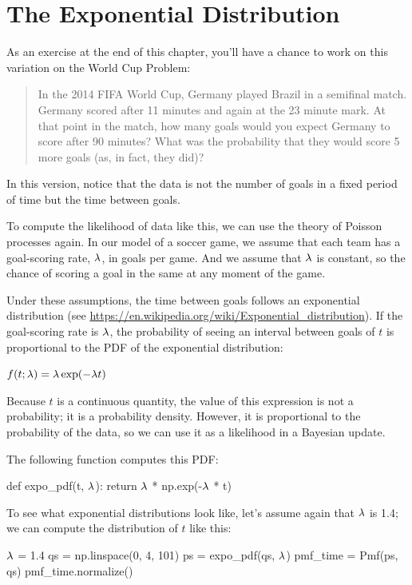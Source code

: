 \documentclass[12pt]{book}
\theoremstyle{exercise}
\begin{document}
\section{The Exponential Distribution}
\label{exponential}

As an exercise at the end of this chapter, you'll have a chance to work on  this variation on the World Cup Problem:

\begin{quote}
In the 2014 FIFA World Cup, Germany played Brazil in a semifinal match. Germany scored after 11 minutes and again at the 23 minute mark. 
At that point in the match, how many goals would you expect Germany to score after 90 minutes? 
What was the probability that they would score 5 more goals (as, in fact, they did)?
\end{quote}

In this version, notice that the data is not the number of goals in a fixed period of time but the time between goals.

To compute the likelihood of data like this, we can use the theory of Poisson processes again.  
In our model of a soccer game, we assume that each team has a goal-scoring rate, $\mathtt{\lambda}$, in goals per game.  
And we assume that $\mathtt{\lambda}$ is constant, so the chance of scoring a goal in the same at any moment of the game.

Under these assumptions, the time between goals follows an exponential distribution (see \url{https://en.wikipedia.org/wiki/Exponential_distribution}).
If the goal-scoring rate is $\mathtt{\lambda}$, the probability of seeing an interval between goals of $t$ is proportional to the PDF of the exponential distribution:

$f(t; \mathtt{\lambda}) = \mathtt{\lambda} \exp(-\mathtt{\lambda} t)$

Because $t$ is a continuous quantity, the value of this expression is not a probability; it is a probability density.  
However, it is proportional to the probability of the data, so we can use it as a likelihood in a Bayesian update.

The following function computes this PDF:

\begin{code}
def expo_pdf(t, $\mathtt{\lambda}$):
    return $\mathtt{\lambda}$ * np.exp(-$\mathtt{\lambda}$ * t)
\end{code}

To see what exponential distributions look like, let's assume again that $\mathtt{\lambda}$ is 1.4; we can compute the distribution of $t$ like this:

\begin{code}
$\mathtt{\lambda}$ = 1.4
qs = np.linspace(0, 4, 101)
ps = expo_pdf(qs, $\mathtt{\lambda}$)
pmf_time = Pmf(ps, qs)
pmf_time.normalize()
\end{code}
\end{document}
